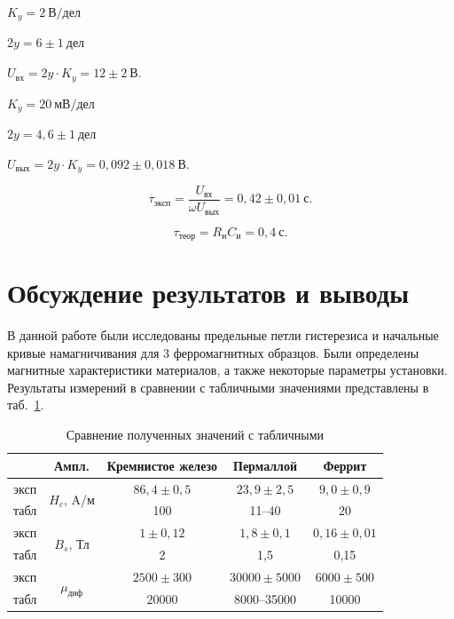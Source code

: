 \documentclass[a4paper, 12pt]{article}
\begin{document}
\begin{description}
\item{} $K_y = 2~В/дел$
\item{} $2y = 6\pm1~дел$
\item{} $U_{вх} = 2y \cdot K_y = 12\pm2~В$.
\item{}
\item{} $K_y = 20~мВ/дел$
\item{} $2y = 4,6\pm1~дел$
\item{} $U_{вых} = 2y \cdot K_y = 0,092\pm0,018~В$.
\end{description}

$$\tau_{эксп} = \frac{U_{вх}}{\omega U_{вых}} = 0,42\pm0,01~с.$$

$$\tau_{теор} = R_и C_и = 0,4~с.$$

\section{Обсуждение результатов и выводы}

В данной работе были исследованы предельные петли гистерезиса и начальные кривые намагничивания для 3 ферромагнитных образцов. Были определены магнитные характеристики материалов, а также некоторые параметры установки. Результаты измерений в сравнении с табличными значениями представлены в таб.~\ref{tab2}.

\begin{table}[h!]
\begin{center}
\begin{tabular}{|c|c|c|c|c|}
\hline
 & Ампл. & Кремнистое железо & Пермаллой & Феррит \\ \hline
эксп & \multirow{2}{*}{$H_c$, A/м} & $86,4 \pm 0,5$ & $23,9 \pm 2,5$ & $9,0 \pm 0,9$ \\ \cline{1-1} \cline{3-5} 
табл &  & 100 & 11--40 & 20 \\ \hline
эксп & \multirow{2}{*}{$B_s$, Тл} & $1 \pm 0,12$ & $1,8 \pm 0,1$ & $0,16 \pm 0,01$ \\ \cline{1-1} \cline{3-5} 
табл &  & 2 & 1,5 & 0,15 \\ \hline
эксп & \multirow{2}{*}{$\mu_{диф}$} & $2500 \pm 300$ & $30000 \pm 5000$ & $6000 \pm 500$ \\ \cline{1-1} \cline{3-5} 
табл &  & 20000 & 8000--35000 & 10000 \\ \hline
\end{tabular}
\end{center}
\caption{Сравнение полученных значений с табличными}
\label{tab2}
\end{table}
\end{document}

